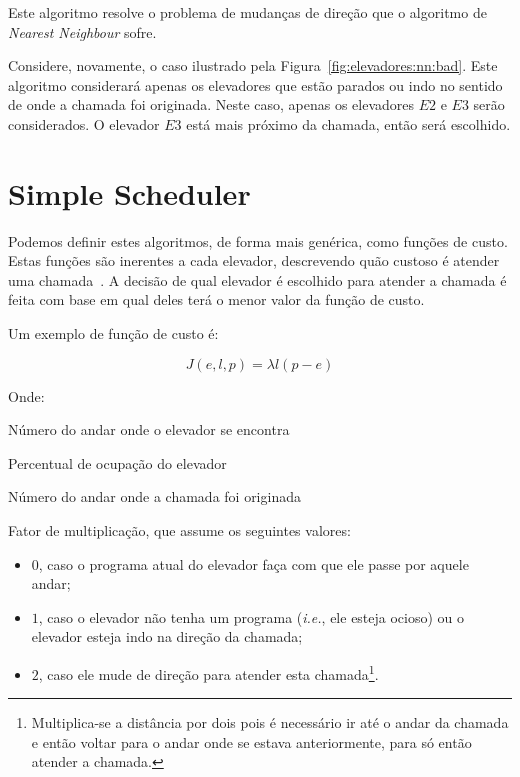 Este algoritmo resolve o problema de mudanças de direção que o algoritmo de
\textit{Nearest Neighbour} sofre.

Considere, novamente, o caso ilustrado pela Figura~\ref{fig:elevadores:nn:bad}.
Este algoritmo considerará apenas os elevadores que estão parados ou indo no
sentido de onde a chamada foi originada. Neste caso, apenas os elevadores $E2$ e
$E3$ serão considerados. O elevador $E3$ está mais próximo da chamada, então
será escolhido.

\section{\label{sec:ai:minimize-cost-function}Simple Scheduler}

Podemos definir estes algoritmos, de forma mais genérica, como funções de custo.
Estas funções são inerentes a cada elevador, descrevendo quão custoso é
atender uma chamada~\cite{Friese20061908}. A decisão de qual elevador é
escolhido para atender a chamada é feita com base em qual deles terá o menor
valor da função de custo.


Um exemplo de função de custo é:

\[
  J(e, l, p) = \lambda l(p - e)
\]

Onde:
\begin{description}[leftmargin=!,labelwidth=\widthof{\bfseries Pu}]\setlength\itemsep{0mm}
\item[$\boldsymbol{e}$] Número do andar onde o elevador se encontra
\item[$\boldsymbol{l}$] Percentual de ocupação do elevador
\item[$\boldsymbol{p}$] Número do andar onde a chamada foi originada
\item[$\boldsymbol{\lambda}$] Fator de multiplicação, que assume os seguintes valores:
  \begin{itemize}\setlength\itemsep{0mm}
    \item $0$, caso o programa atual do elevador faça com que ele passe por
      aquele andar;
    \item $1$, caso o elevador não tenha um programa (\textit{i.e.},
      ele esteja ocioso) ou o elevador esteja indo na direção da chamada;
    \item $2$, caso ele mude de direção para atender esta chamada\footnote{Multiplica-se
        a distância por dois pois é necessário ir até o andar da chamada e então
        voltar para o andar onde se estava anteriormente, para só então atender
        a chamada.}.
  \end{itemize}
\end{description}

